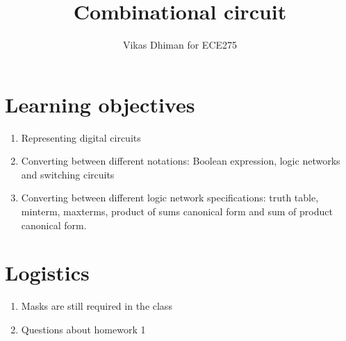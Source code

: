 \documentclass{article}
\title{Combinational circuit}
\author{Vikas Dhiman for ECE275}
\begin{document}
\maketitle
\section{Learning objectives}
\begin{enumerate}
\item Representing digital circuits
\item Converting between different notations: Boolean expression, logic
  networks and switching circuits
\item Converting between different logic network specifications: truth table, minterm,
  maxterms, product of sums canonical form and sum of product canonical form.
\end{enumerate}

\section{Logistics}
\begin{enumerate}
  \item Masks are still required in the class
  \item Questions about homework 1
\end{enumerate}

\newpage
\end{document}
